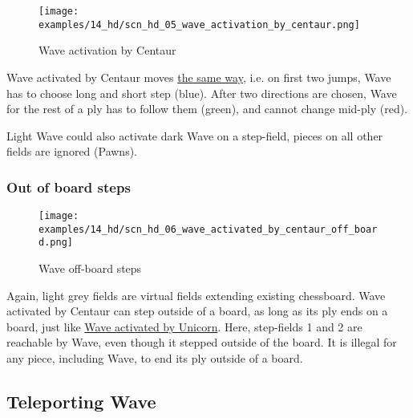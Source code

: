 \vspace*{-1.0\baselineskip}
\noindent
\begin{figure}[!h]
\texttt{[image: examples/14\_hd/scn\_hd\_05\_wave\_activation\_by\_centaur.png]}
\caption{Wave activation by Centaur}
\label{fig:scn_hd_05_wave_activation_by_centaur}
\end{figure}

Wave activated by Centaur moves \hyperref[fig:scn_hd_03_centaur_multi_step]{the same way},
i.e. on first two jumps, Wave has to choose long and short step (blue). After two directions
are chosen, Wave for the rest of a ply has to follow them (green), and cannot change mid-ply
(red).

Light Wave could also activate dark Wave on a step-field, pieces on all other fields are
ignored (Pawns).

\clearpage %

\subsubsection*{Out of board steps}

\vspace*{-1.2\baselineskip}
\noindent
\begin{figure}[!h]
\texttt{[image: examples/14\_hd/scn\_hd\_06\_wave\_activated\_by\_centaur\_off\_board.png]}
\caption{Wave off-board steps}
\label{fig:scn_hd_06_wave_activated_by_centaur_off_board}
\end{figure}

Again, light grey fields are virtual fields extending existing chessboard.
Wave activated by Centaur can step outside of a board, as long as its ply
ends on a board, just like
\hyperref[fig:scn_mv_26_wave_off_board]{Wave activated by Unicorn}. Here,
step-fields 1 and 2 are reachable by Wave, even though it stepped outside
of the board. It is illegal for any piece, including Wave, to end its ply
outside of a board.

\clearpage %

\subsection*{Teleporting Wave}

